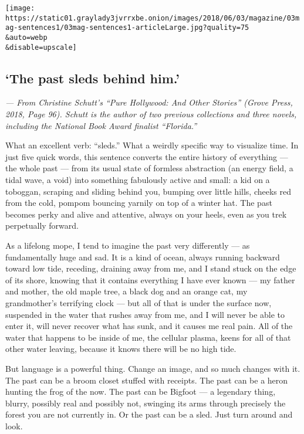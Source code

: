 \texttt{[image: https://static01.graylady3jvrrxbe.onion/images/2018/06/03/magazine/03mag-sentences1/03mag-sentences1-articleLarge.jpg?quality=75\\\&auto=webp\\\&disable=upscale]}

\hypertarget{the-past-sleds-behind-him}{%
\subsection{`The past sleds behind
him.'}\label{the-past-sleds-behind-him}}

\emph{--- From Christine Schutt's ``Pure Hollywood: And Other Stories''
(Grove Press, 2018, Page 96). Schutt is the author of two previous
collections and three novels, including the National Book Award finalist
``Florida.''}

What an excellent verb: ``sleds.'' What a weirdly specific way to
visualize time. In just five quick words, this sentence converts the
entire history of everything --- the whole past --- from its usual state
of formless abstraction (an energy field, a tidal wave, a void) into
something fabulously active and small: a kid on a toboggan, scraping and
sliding behind you, bumping over little hills, cheeks red from the cold,
pompom bouncing yarnily on top of a winter hat. The past becomes perky
and alive and attentive, always on your heels, even as you trek
perpetually forward.

As a lifelong mope, I tend to imagine the past very differently --- as
fundamentally huge and sad. It is a kind of ocean, always running
backward toward low tide, receding, draining away from me, and I stand
stuck on the edge of its shore, knowing that it contains everything I
have ever known --- my father and mother, the old maple tree, a black
dog and an orange cat, my grandmother's terrifying clock --- but all of
that is under the surface now, suspended in the water that rushes away
from me, and I will never be able to enter it, will never recover what
has sunk, and it causes me real pain. All of the water that happens to
be inside of me, the cellular plasma, keens for all of that other water
leaving, because it knows there will be no high tide.

But language is a powerful thing. Change an image, and so much changes
with it. The past can be a broom closet stuffed with receipts. The past
can be a heron hunting the frog of the now. The past can be Bigfoot ---
a legendary thing, blurry, possibly real and possibly not, swinging its
arms through precisely the forest you are not currently in. Or the past
can be a sled. Just turn around and look.

